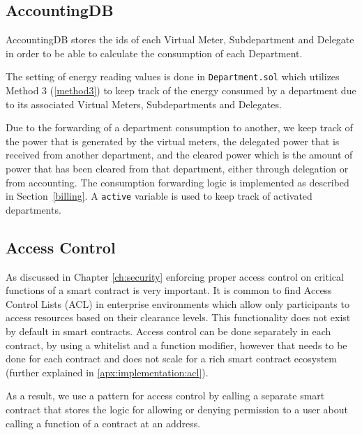

\subsection{AccountingDB}

AccountingDB stores the ids of each Virtual Meter, Subdepartment and Delegate in order to be able to calculate the consumption of each Department. 

The setting of energy reading values is done in \texttt{Department.sol} which utilizes Method 3 (\ref{method3}) to keep track of the energy consumed by a department due to its associated Virtual Meters, Subdepartments and Delegates. 

Due to the forwarding of a department consumption to another, we keep track of the power that is generated by the virtual meters, the delegated power that is received from another department, and the cleared power which is the amount of power that has been cleared from that department, either through delegation or from accounting. The consumption forwarding logic is implemented as described in Section~\ref{billing}. A \texttt{active} variable is used to keep track of activated departments.



\subsection{Access Control} \label{acl}
As discussed in Chapter \ref{ch:security} enforcing proper access control on critical functions of a smart contract is very important. It is common to find Access Control Lists (ACL) in enterprise environments which allow only participants to access resources based on their clearance levels. This functionality does not exist by default in smart contracts. Access control can be done separately in each contract, by using a whitelist and a function modifier, however that needs to be done for each contract and does not scale for a rich smart contract ecosystem (further explained in \ref{apx:implementation:acl}). 

As a result, we use a pattern for access control by calling a separate smart contract that stores the logic for allowing or denying permission to a user about calling a function of a contract at an address. 

